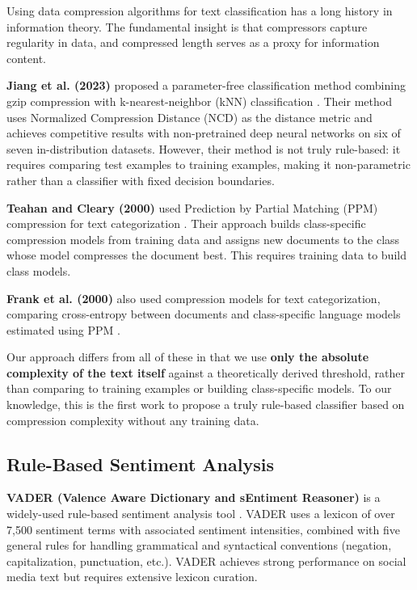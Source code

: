 \documentclass[11pt,letterpaper]{article}
\begin{document}
Using data compression algorithms for text classification has a long history in information theory. The fundamental insight is that compressors capture regularity in data, and compressed length serves as a proxy for information content.

\textbf{Jiang et al. (2023)} proposed a parameter-free classification method combining gzip compression with k-nearest-neighbor (kNN) classification \cite{Jiang2023}. Their method uses Normalized Compression Distance (NCD) as the distance metric and achieves competitive results with non-pretrained deep neural networks on six of seven in-distribution datasets. However, their method is not truly rule-based: it requires comparing test examples to training examples, making it non-parametric rather than a classifier with fixed decision boundaries.

\textbf{Teahan and Cleary (2000)} used Prediction by Partial Matching (PPM) compression for text categorization \cite{Teahan2000}. Their approach builds class-specific compression models from training data and assigns new documents to the class whose model compresses the document best. This requires training data to build class models.

\textbf{Frank et al. (2000)} also used compression models for text categorization, comparing cross-entropy between documents and class-specific language models estimated using PPM \cite{Frank2000}.

Our approach differs from all of these in that we use \textbf{only the absolute complexity of the text itself} against a theoretically derived threshold, rather than comparing to training examples or building class-specific models. To our knowledge, this is the first work to propose a truly rule-based classifier based on compression complexity without any training data.

\subsection{Rule-Based Sentiment Analysis}

\textbf{VADER (Valence Aware Dictionary and sEntiment Reasoner)} is a widely-used rule-based sentiment analysis tool \cite{Hutto2014}. VADER uses a lexicon of over 7,500 sentiment terms with associated sentiment intensities, combined with five general rules for handling grammatical and syntactical conventions (negation, capitalization, punctuation, etc.). VADER achieves strong performance on social media text but requires extensive lexicon curation.
\end{document}
